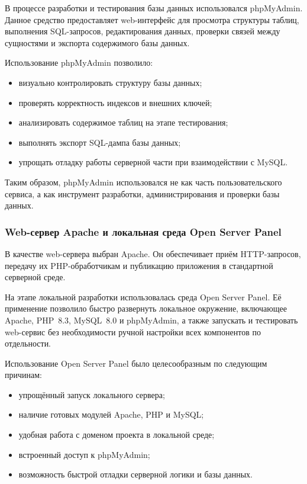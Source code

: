 В процессе разработки и тестирования базы данных использовался phpMyAdmin. Данное средство предоставляет web-интерфейс для просмотра структуры таблиц, выполнения SQL-запросов, редактирования данных, проверки связей между сущностями и экспорта содержимого базы данных.

Использование phpMyAdmin позволило:
\begin{itemize}
	\item визуально контролировать структуру базы данных;
	\item проверять корректность индексов и внешних ключей;
	\item анализировать содержимое таблиц на этапе тестирования;
	\item выполнять экспорт SQL-дампа базы данных;
	\item упрощать отладку работы серверной части при взаимодействии с MySQL.
\end{itemize}

Таким образом, phpMyAdmin использовался не как часть пользовательского сервиса, а как инструмент разработки, администрирования и проверки базы данных.

\subsubsection{Web-сервер Apache и локальная среда Open Server Panel}

В качестве web-сервера выбран Apache. Он обеспечивает приём HTTP-запросов, передачу их PHP-обработчикам и публикацию приложения в стандартной серверной среде.

На этапе локальной разработки использовалась среда Open Server Panel. Её применение позволило быстро развернуть локальное окружение, включающее Apache, PHP~8.3, MySQL~8.0 и phpMyAdmin, а также запускать и тестировать web-сервис без необходимости ручной настройки всех компонентов по отдельности.

Использование Open Server Panel было целесообразным по следующим причинам:
\begin{itemize}
	\item упрощённый запуск локального сервера;
	\item наличие готовых модулей Apache, PHP и MySQL;
	\item удобная работа с доменом проекта в локальной среде;
	\item встроенный доступ к phpMyAdmin;
	\item возможность быстрой отладки серверной логики и базы данных.
\end{itemize}

